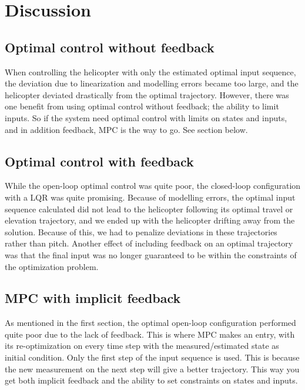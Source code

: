 \section{Discussion}\label{sec:discussion}
\subsection{Optimal control without feedback}
When controlling the helicopter with only the estimated optimal input sequence, the deviation due to linearization and modelling errors became too large, and the helicopter deviated drastically from the optimal trajectory. However, there was one benefit from using optimal control without feedback; the ability to limit inputs. So if the system need optimal control with limits on states and inputs, and in addition feedback, MPC is the way to go. See section below.

\subsection{Optimal control with feedback}
While the open-loop optimal control was quite poor, the closed-loop configuration with a LQR was quite promising. Because of modelling errors, the optimal input sequence calculated did not lead to the helicopter following its optimal travel or elevation trajectory, and we ended up with the helicopter drifting away from the solution. Because of this, we had to penalize deviations in these trajectories rather than pitch. Another effect of including feedback on an optimal trajectory was that the final input was no longer guaranteed to be within the constraints of the optimization problem.

\subsection{MPC with implicit feedback}
As mentioned in the first section, the optimal open-loop configuration performed quite poor due to the lack of feedback. This is where MPC makes an entry, with its re-optimization on every time step with the measured/estimated state as initial condition. Only the first step of the input sequence is used. This is because the new measurement on the next step will give a better trajectory. This way you get both implicit feedback and the ability to set constraints on states and inputs. 